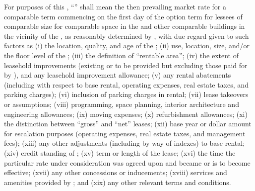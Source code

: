 For purposes of this \lease, ``\fairMarketValue'' shall mean the then prevailing market rate for a comparable term commencing on the first day of the option term for lessees of comparable size for comparable space in the \building and other comparable buildings in the vicinity of the \building, as reasonably determined by \lessor, with due regard given to such factors as (i) the location, quality, and age of the \building; (ii) use, location, size, and/or the floor level of the \premises; (iii) the definition of ``rentable area''; (iv) the extent of leasehold improvements (existing or to be provided but excluding those paid for by \lessee), and any leasehold improvement allowance; (v) any rental abatements (including with respect to base rental, operating expenses, real estate taxes, and parking charges); (vi) inclusion of parking charges in rental; (vii) lease takeovers or assumptions; (viii) programming, space planning, interior architecture and engineering allowances; (ix) moving expenses; (x) refurbishment allowances; (xi) the distinction between ``gross'' and ``net'' leases; (xii) base year or dollar amount for escalation purposes (operating expenses, real estate taxes, and management fees); (xiii) any other adjustments (including by way of indexes) to base rental; (xiv) credit standing of \lessee; (xv) term or length of the lease; (xvi) the time the particular rate under consideration was agreed upon and became or is to become effective; (xvii) any other concessions or inducements; (xviii) services and amenities provided by \lessor; and (xix) any other relevant terms and conditions.

